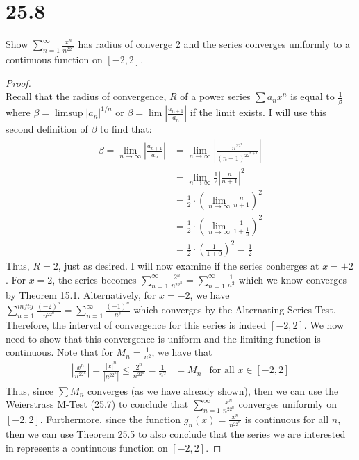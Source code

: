 \documentclass[10pt,a4paper]{article}
\theoremstyle{definition}
\begin{document}
\section*{25.8}
Show $\displaystyle \sum_{n = 1}^{\infty} \frac{x^n}{n^22^n}$ has radius of converge 2 and the series converges uniformly to a continuous function on $[-2,2]$.

\begin{proof}{$ $}
\\Recall that the radius of convergence, $R$ of a power series $\sum a_nx^n$ is equal to $\frac{1}{\beta}$ where $\beta = \limsup |a_n|^{1/n}$ or $\beta = \lim \left|\frac{a_{n+1}}{a_n}\right|$ if the limit exists. I will use this second definition of $\beta$ to find that:
\begin{align*}
\beta = \lim_{n \to \infty} \left|\frac{a_{n+1}}{a_n}\right| &= \lim_{n \to \infty} \left|\frac{n^22^n}{(n+1)^22^{n+1}}\right|\\
&= \lim_{n \to \infty} \frac{1}{2}\left|\frac{n}{n + 1}\right|^2\\
&= \frac{1}{2}\cdot \left(\lim_{n \to \infty} \frac{n}{n + 1}\right)^2\\
&= \frac{1}{2} \cdot \left(\lim_{n \to \infty} \frac{1}{1 + \frac{1}{n}}\right)^2\\
&= \frac{1}{2} \cdot \left(\frac{1}{1 + 0}\right)^2 = \frac{1}{2}
\end{align*}
Thus, $R = 2$, just as desired. I will now examine if the series conberges at $x = \pm 2$. For $x = 2$, the series becomes $\displaystyle \sum_{n =1}^{\infty} \frac{2^n}{n^22^n} = \sum_{n = 1}^{\infty} \frac{1}{n^2}$ which we know converges by Theorem 15.1. Alternatively, for $x = -2$, we have $\displaystyle \sum_{n =1}^{infty} \frac{(-2)^n}{n^22^n} = \sum_{n = 1}^{\infty} \frac{(-1)^n}{n^2}$ which converges by the Alternating Series Test. Therefore, the interval of convergence for this series is indeed $[-2,2]$. We now need to show that this convergence is uniform and the limiting function is continuous. Note that for $M_n = \frac{1}{n^2}$, we have that 
\begin{align*}
\left|\frac{x^n}{n^22^n}\right| = \frac{|x|^n}{|n^22^n|} \leq \frac{2^n}{n^22^n} = \frac{1}{n^2} &= M_n &\text{for all $x \in [-2,2]$}
\end{align*}
Thus, since $\sum M_n$ converges (as we have already shown), then we can use the Weierstrass M-Test (25.7) to conclude that $\displaystyle \sum_{n = 1}^{\infty} \frac{x^n}{n^22^n}$ converges uniformly on $[-2,2]$. Furthermore, since the function $\displaystyle g_n(x) = \frac{x^n}{n^22^n}$ is continuous for all $n$, then we can use Theorem 25.5 to also conclude that the series we are interested in represents a continuous function on $[-2,2]$.
\end{proof}
\end{document}
